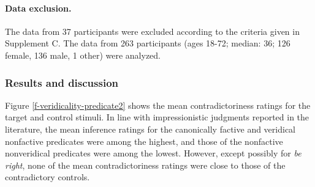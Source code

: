 \documentclass{language}
\newcommand{\6}{\mbox{$[\hspace*{-.6mm}[$}}
\newcommand{\9}{\mbox{$]\hspace*{-.6mm}]$}}
\begin{document}
%
%


\paragraph{Data exclusion.} The data from 37 participants were excluded according to the criteria given in Supplement C. The data from 263 participants (ages 18-72; median: 36; 126 female, 136 male, 1 other) were analyzed.

\subsubsection{Results and discussion}


Figure \ref{f-veridicality-predicate2} shows the mean contradictoriness ratings for the target and control stimuli. In line with impressionistic judgments reported in the literature, the mean inference ratings for the canonically factive and veridical nonfactive predicates were among the highest, and those of the nonfactive nonveridical predicates were among the lowest. However, except possibly for {\em be right}, none of the mean contradictoriness ratings were close to those of the contradictory controls.

\end{document}
